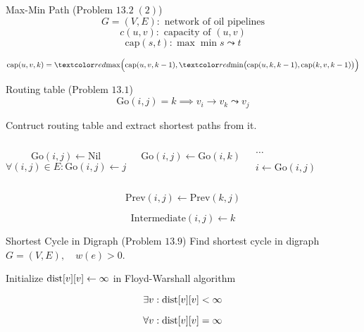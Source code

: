 \begin{frame}{}
  \begin{exampleblock}{Max-Min Path (Problem $13.2\; (2)$)}
    \[
      G = (V, E): \text{ network of oil pipelines}
    \]
    \[
      c(u,v): \text{ capacity of } (u,v)
    \]
    \[
      \text{cap}(s,t): \max \min s \leadsto t
    \]
      
    \vspace{0.30cm}
    \centerline{}
  \end{exampleblock}

  \pause
  \[
    \text{cap}(u,v,k) = \red{\max}\Big(\text{cap}(u,v,k-1), \red{\min}\big(\text{cap}(u,k,k-1), \text{cap}(k,v,k-1)\big)\Big)
  \]
\end{frame}
\begin{frame}{}
  \begin{exampleblock}{Routing table (Problem $13.1$)}
    \[
      \text{Go}(i,j) = k \implies v_i \to v_k \leadsto v_j
    \]

    Contruct routing table and extract shortest paths from it.
  \end{exampleblock}

  \pause
  \vspace{0.30cm}
  \begin{columns}
      \[
	\text{Go}(i,j) \gets \text{Nil}
      \]
      \[
	\forall (i,j) \in E: \text{Go}(i,j) \gets j
      \]

      \begin{algorithmic}
	\If{$\dots$}
	  \State $\text{Go}(i,j) \gets \text{Go}(i,k)$
	\EndIf
      \end{algorithmic}
      \begin{algorithmic}
	  \State $\dots$
	\EndIf

	\Statex
	  \State $i \gets \text{Go}(i,j)$
	\EndWhile
      \end{algorithmic}
  \end{columns}

  \pause
  \vspace{0.50cm}
  \[
    \text{Prev}(i,j) \gets \text{Prev}(k,j)
  \]

  \pause
  \[
    \text{Intermediate}(i,j) \gets k
  \]
\end{frame}
\begin{frame}{}
  \begin{exampleblock}{Shortest Cycle in Digraph (Problem $13.9$)}
    Find shortest cycle in digraph $G = (V, E), \quad w(e) > 0$.
  \end{exampleblock}

  \pause
  \vspace{0.50cm}
  \centerline{Initialize $\text{dist}[v][v] \gets \infty$ in Floyd-Warshall algorithm} 

  \pause
  \[
    \exists v: \text{dist}[v][v] < \infty
  \]

  \pause
  \[
    \forall v: \text{dist}[v][v] = \infty
  \]
\end{frame}
